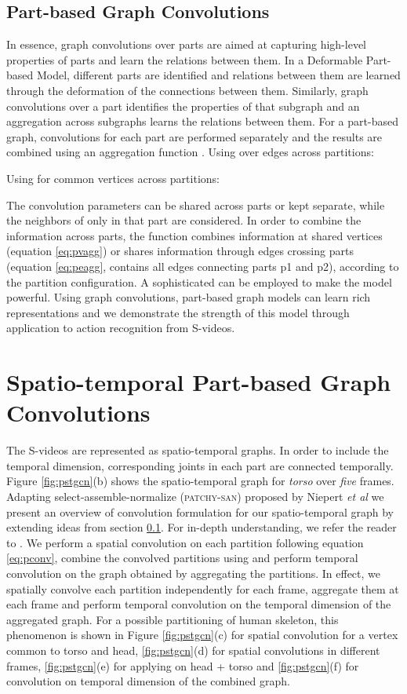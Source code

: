 \documentclass{bmvc2k}
\def\etal{\emph{et al}\bmvaOneDot}
\begin{document}
\subsection{Part-based Graph Convolutions}
\label{sec:3_2}
In essence, graph convolutions over parts are aimed at capturing high-level properties of parts and learn the relations between them. In a Deformable Part-based Model, different parts are identified and relations between them are learned through the deformation of the connections between them. Similarly, graph convolutions over a part identifies the properties of that subgraph and an aggregation across subgraphs learns the relations between them. For a part-based graph, convolutions for each part are performed separately and the results are combined using an aggregation function . Using  over edges across partitions:
\begingroup
\small

\endgroup
Using  for common vertices across partitions:
\begingroup
\small

\endgroup
The convolution parameters  can be shared across parts or kept separate, while the neighbors of  only in that part  are considered. In order to combine the information across parts, the function  combines information at shared vertices (equation \ref{eq:pvagg}) or shares information through edges crossing parts (equation \ref{eq:peagg},  contains all edges connecting parts p1 and p2), according to the partition configuration. A sophisticated  can be employed to make the model powerful. Using graph convolutions, part-based graph models can learn rich representations and we demonstrate the strength of this model through application to action recognition from S-videos.

\section{Spatio-temporal Part-based Graph Convolutions}
\label{sec:stmodel}
The S-videos are represented as spatio-temporal graphs. In order to include the temporal dimension, corresponding joints in each part are connected temporally. Figure \ref{fig:pstgcn}(b) shows the spatio-temporal graph for \textit{torso} over \textit{five} frames. Adapting select-assemble-normalize (\textsc{patchy-san}) proposed by Niepert \etal \cite{niepert2016learning} we present an overview of convolution formulation for our spatio-temporal graph by extending ideas from section \ref{sec:3_2}. For in-depth understanding, we refer the reader to \cite{niepert2016learning}. We perform a spatial convolution on each partition following equation \ref{eq:pconv}, combine the convolved partitions using  and perform temporal convolution on the graph obtained by aggregating the partitions. In effect, we spatially convolve each partition independently for each frame, aggregate them at each frame and perform temporal convolution on the temporal dimension of the aggregated graph. For a possible partitioning of human skeleton, this phenomenon is shown in Figure \ref{fig:pstgcn}(c) for spatial convolution for a vertex common to torso and head, \ref{fig:pstgcn}(d) for spatial convolutions in different frames, \ref{fig:pstgcn}(e) for applying  on head + torso and \ref{fig:pstgcn}(f) for convolution on temporal dimension of the combined graph.
\end{document}
